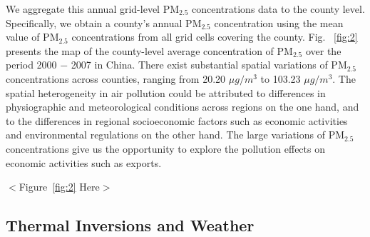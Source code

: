 \documentclass[12pt]{article}
\begin{document}
   We aggregate this annual grid-level $\mathrm{PM_{2.5}}$ concentrations data to the county level.
  Specifically, we obtain a county's annual $\mathrm{PM_{2.5}}$ concentration
  using the mean value of $\mathrm{PM_{2.5}}$ concentrations from all grid
  cells covering the county. Fig.~%
  \ref{fig:2} presents the map of the county-level average concentration of $%
  \mathrm{PM_{2.5}}$ over the period 2000 $-$ 2007 in China. There exist
  substantial spatial variations of $\mathrm{PM_{2.5}}$ concentrations across
  counties, ranging from 20.20 $\mu g/m^{3}$ to 103.23 $\mu g/m^{3}$. The spatial heterogeneity in air pollution could be
  attributed to differences in physiographic and meteorological conditions
  across regions on the one hand, and to the differences in regional
  socioeconomic factors such as economic activities and environmental
  regulations on the other hand. The large variations of $\mathrm{PM_{2.5}}$
  concentrations give us the opportunity to explore the pollution effects on
  economic activities such as exports. 
  
  \begin{center}
  $<$Figure~\ref{fig:2} Here$>$
  \end{center}

  \subsection{Thermal Inversions and Weather}
\end{document}
